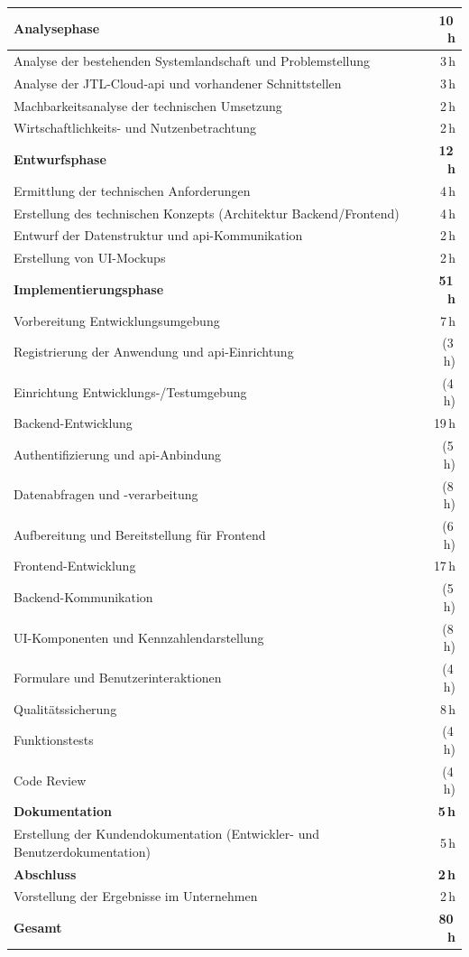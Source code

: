 \documentclass[11pt, a4paper, oneside]{report}
\begin{document}
\begin{tabularx}{\textwidth}{X r}
  \toprule
  \textbf{Analysephase} & \textbf{10\,h} \\
  \midrule
  Analyse der bestehenden Systemlandschaft und Problemstellung & 3\,h \\
  Analyse der JTL-Cloud-\gls{api} und vorhandener Schnittstellen & 3\,h \\
  Machbarkeitsanalyse der technischen Umsetzung & 2\,h \\
  Wirtschaftlichkeits- und Nutzenbetrachtung & 2\,h \\
  \toprule
  \textbf{Entwurfsphase} & \textbf{12\,h} \\
  \midrule
  Ermittlung der technischen Anforderungen & 4\,h \\
  Erstellung des technischen Konzepts (Architektur Backend/Frontend) & 4\,h \\
  Entwurf der Datenstruktur und \gls{api}-Kommunikation & 2\,h \\
  Erstellung von UI-Mockups & 2\,h \\
  \toprule
  \textbf{Implementierungsphase} & \textbf{51\,h} \\
  \midrule
  Vorbereitung Entwicklungsumgebung & 7\,h \\
  \quad Registrierung der Anwendung und \gls{api}-Einrichtung & (3\,h) \\
  \quad Einrichtung Entwicklungs-/Testumgebung & (4\,h) \\
  Backend-Entwicklung & 19\,h \\
  \quad Authentifizierung und \gls{api}-Anbindung & (5\,h) \\
  \quad Datenabfragen und -verarbeitung & (8\,h) \\
  \quad Aufbereitung und Bereitstellung für Frontend & (6\,h) \\
  Frontend-Entwicklung & 17\,h \\
  \quad Backend-Kommunikation & (5\,h) \\
  \quad UI-Komponenten und Kennzahlendarstellung & (8\,h) \\
  \quad Formulare und Benutzerinteraktionen & (4\,h) \\
  Qualitätssicherung & 8\,h \\
  \quad Funktionstests & (4\,h) \\
  \quad Code Review & (4\,h) \\
  \toprule
  \textbf{Dokumentation} & \textbf{5\,h} \\
  \midrule
  Erstellung der Kundendokumentation (Entwickler- und Benutzerdokumentation) & 5\,h \\
  \toprule
  \textbf{Abschluss} & \textbf{2\,h} \\
  \midrule
  Vorstellung der Ergebnisse im Unternehmen & 2\,h \\
  \toprule
  \textbf{Gesamt} & \textbf{80\,h} \\
  \bottomrule
\end{tabularx}
\end{document}
